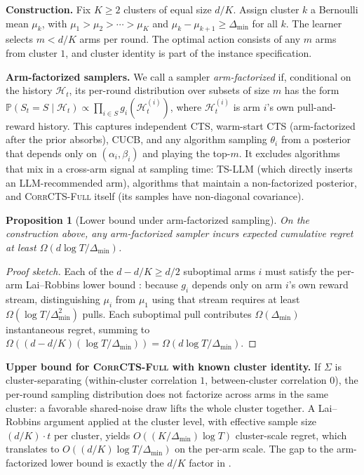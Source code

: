 \documentclass{article}
\theoremstyle{plain}
\newtheorem{proposition}[theorem]{Proposition}
\theoremstyle{definition}
\theoremstyle{remark}
\newcommand{\Prob}{\mathbb{P}}
\newcommand{\gap}{\Delta_{\min}}
\newcommand{\CorrFull}{\textsc{CorrCTS-Full}}
\begin{document}
\textbf{Construction.}
Fix $K \geq 2$ clusters of equal size $d/K$.
Assign cluster $k$ a Bernoulli mean $\mu_k$, with $\mu_1 > \mu_2 > \cdots > \mu_K$ and $\mu_k - \mu_{k+1} \geq \gap$ for all $k$.
The learner selects $m < d/K$ arms per round.
The optimal action consists of any $m$ arms from cluster $1$, and cluster identity is part of the instance specification.

\textbf{Arm-factorized samplers.}
We call a sampler \emph{arm-factorized} if, conditional on the history $\mathcal{H}_t$, its per-round distribution over subsets of size $m$ has the form $\Prob(S_t = S \mid \mathcal{H}_t) \propto \prod_{i \in S} g_i(\mathcal{H}_t^{(i)})$, where $\mathcal{H}_t^{(i)}$ is arm $i$'s own pull-and-reward history.
This captures independent CTS, warm-start CTS (arm-factorized after the prior absorbs), CUCB, and any algorithm sampling $\theta_i$ from a posterior that depends only on $(\alpha_i, \beta_i)$ and playing the top-$m$.
It excludes algorithms that mix in a cross-arm signal at sampling time: TS-LLM (which directly inserts an LLM-recommended arm), algorithms that maintain a non-factorized posterior, and \CorrFull{} itself (its samples have non-diagonal covariance).

\begin{proposition}[Lower bound under arm-factorized sampling]\label{prop:lowerbound}
On the construction above, any arm-factorized sampler incurs expected cumulative regret at least $\Omega(d \log T / \gap)$.
\end{proposition}

\begin{proof}[Proof sketch]
Each of the $d - d/K \geq d/2$ suboptimal arms $i$ must satisfy the per-arm Lai--Robbins lower bound \citep{lai1985asymptotically}: because $g_i$ depends only on arm $i$'s own reward stream, distinguishing $\mu_i$ from $\mu_1$ using that stream requires at least $\Omega(\log T / \gap^2)$ pulls.
Each suboptimal pull contributes $\Omega(\gap)$ instantaneous regret, summing to $\Omega((d - d/K)(\log T / \gap)) = \Omega(d \log T / \gap)$.
\end{proof}

\textbf{Upper bound for \CorrFull{} with known cluster identity.}
If $\Sigma$ is cluster-separating (within-cluster correlation $1$, between-cluster correlation $0$), the per-round sampling distribution does not factorize across arms in the same cluster: a favorable shared-noise draw lifts the whole cluster together.
A Lai--Robbins argument applied at the cluster level, with effective sample size $(d/K) \cdot t$ per cluster, yields $O((K / \gap) \log T)$ cluster-scale regret, which translates to $O((d/K) \log T / \gap)$ on the per-arm scale.
The gap to the arm-factorized lower bound is exactly the $d/K$ factor in .
\end{document}
